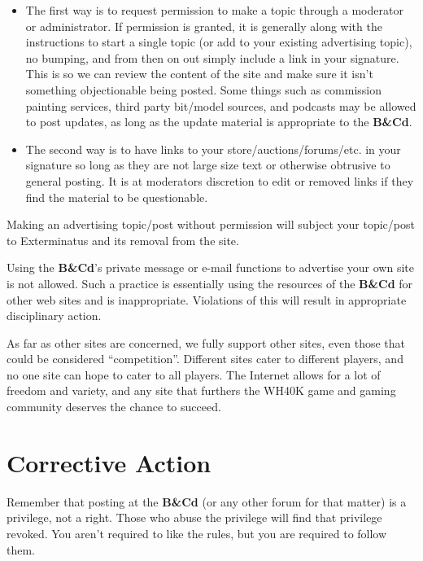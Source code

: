 \documentclass[12pt]{article}
\newcommand{\BnC}{{\textbf{B\&Cd}}}%
\begin{document}
\begin{table}[H]
\begin{itemize}
\item The first way is to request permission to make a topic through a 
moderator or administrator. If permission is granted, it is generally 
along with the instructions to start a single topic (or add to your 
existing advertising topic), no bumping, and from then on out simply 
include a link in your signature. This is so we can review the content 
of the site and make sure it isn't something objectionable being 
posted. Some things such as commission painting services, third party 
bit/model sources, and podcasts may be allowed to post updates, as long 
as the update material is appropriate to the {\BnC}.

\item The second way is to have links to your store/auctions/forums/etc. in 
your signature so long as they are not large size text or otherwise 
obtrusive to general posting. It is at moderators discretion to edit or 
removed links if they find the material to be questionable.
\end{itemize}
	\caption{Main methods for advertising allowed on {\BnC}}
\end{table}

Making an advertising topic/post without permission will subject your 
topic/post to Exterminatus and its removal from the site.

Using the {\BnC}'s private message or e-mail functions to 
advertise your own site is not allowed. Such a practice is essentially 
using the resources of the {\BnC} for other web sites and 
is inappropriate. Violations of this will result in appropriate 
disciplinary action.

As far as other sites are concerned, we fully support other sites, even 
those that could be considered ``competition''. Different sites cater to 
different players, and no one site can hope to cater to all players. 
The Internet allows for a lot of freedom and variety, and any site that 
furthers the WH40K game and gaming community deserves the chance to 
succeed.

\section{Corrective Action}

Remember that posting at the {\BnC} (or any other forum 
for that matter) is a privilege, not a right. Those who abuse the 
privilege will find that privilege revoked. You aren't required to like 
the rules, but you are required to follow them.
\end{document}
